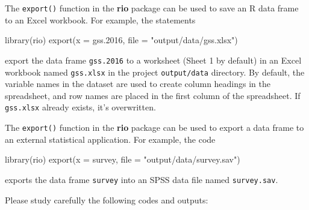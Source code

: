 \documentclass[
]{book}
\newenvironment{Shaded}{\begin{snugshade}}{\end{snugshade}}
\newcommand{\AttributeTok}[1]{\textcolor[rgb]{0.77,0.63,0.00}{#1}}
\newcommand{\FloatTok}[1]{\textcolor[rgb]{0.00,0.00,0.81}{#1}}
\newcommand{\FunctionTok}[1]{\textcolor[rgb]{0.00,0.00,0.00}{#1}}
\newcommand{\NormalTok}[1]{#1}
\newcommand{\StringTok}[1]{\textcolor[rgb]{0.31,0.60,0.02}{#1}}
\begin{document}
The \texttt{export()} function in the \textbf{rio} package can be used to save an R data frame to an Excel workbook. For example, the statements

\begin{Shaded}
\begin{Highlighting}[]
\FunctionTok{library}\NormalTok{(rio)}
\FunctionTok{export}\NormalTok{(}\AttributeTok{x =}\NormalTok{ gss}\FloatTok{.2016}\NormalTok{, }\AttributeTok{file =} \StringTok{"output/data/gss.xlsx"}\NormalTok{)}
\end{Highlighting}
\end{Shaded}

export the data frame \texttt{gss.2016} to a worksheet (Sheet 1 by default) in an Excel workbook named \texttt{gss.xlsx} in the project \texttt{output/data} directory. By default, the variable names in the dataset are used to create column headings in the spreadsheet, and row names are placed in the first column of the spreadsheet. If \texttt{gss.xlsx} already exists, it's overwritten.

The \texttt{export()} function in the \textbf{rio} package can be used to export a data frame to an external statistical application. For example, the code

\begin{Shaded}
\begin{Highlighting}[]
\FunctionTok{library}\NormalTok{(rio)}
\FunctionTok{export}\NormalTok{(}\AttributeTok{x =}\NormalTok{ survey, }\AttributeTok{file =} \StringTok{"output/data/survey.sav"}\NormalTok{)}
\end{Highlighting}
\end{Shaded}

exports the data frame \texttt{survey} into an SPSS data file named \texttt{survey.sav}.

Please study carefully the following codes and outputs:
\end{document}
